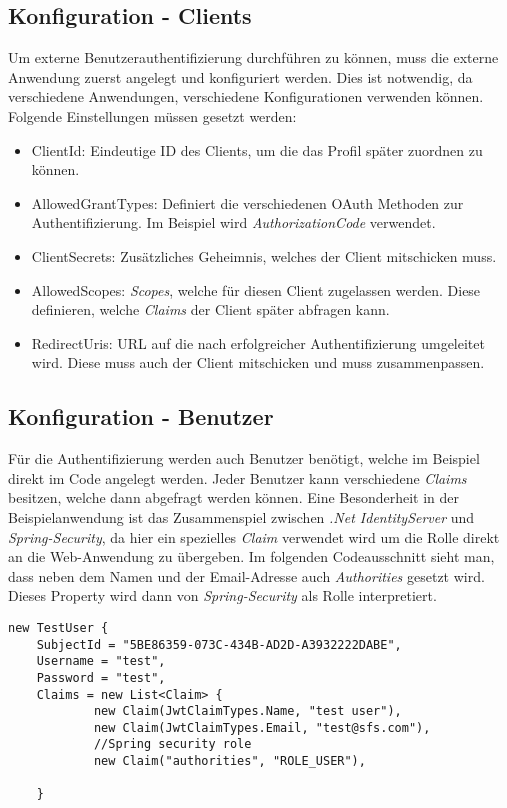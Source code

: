 \subsection*{Konfiguration - Clients}
Um externe Benutzerauthentifizierung durchführen zu können, muss die externe Anwendung zuerst angelegt und konfiguriert werden. Dies ist notwendig, da verschiedene Anwendungen, verschiedene Konfigurationen verwenden können. Folgende Einstellungen müssen gesetzt werden:
\begin{itemize}
\item ClientId: Eindeutige ID des Clients, um die das Profil später zuordnen zu können.
\item AllowedGrantTypes: Definiert die verschiedenen OAuth Methoden zur Authentifizierung. Im Beispiel wird \emph{AuthorizationCode} verwendet.
\item ClientSecrets: Zusätzliches Geheimnis, welches der Client mitschicken muss.
\item AllowedScopes: \emph{Scopes}, welche für diesen Client zugelassen werden. Diese definieren, welche \emph{Claims} der Client später abfragen kann.
\item RedirectUris: URL auf die nach erfolgreicher Authentifizierung umgeleitet wird. Diese muss auch der Client mitschicken und muss zusammenpassen.
\end{itemize}

\subsection*{Konfiguration - Benutzer}
Für die Authentifizierung werden auch Benutzer benötigt, welche im Beispiel direkt im Code angelegt werden. Jeder Benutzer kann verschiedene \emph{Claims} besitzen, welche dann abgefragt werden können. Eine Besonderheit in der Beispielanwendung ist das Zusammenspiel zwischen \emph{.Net IdentityServer} und \emph{Spring-Security}, da hier ein spezielles \emph{Claim} verwendet wird um die Rolle direkt an die Web-Anwendung zu übergeben. Im folgenden Codeausschnitt sieht man, dass neben dem Namen und der Email-Adresse auch \emph{Authorities} gesetzt wird. Dieses Property wird dann von \emph{Spring-Security} als Rolle interpretiert.

\begin{verbatim}
new TestUser {
	SubjectId = "5BE86359-073C-434B-AD2D-A3932222DABE",
	Username = "test",
	Password = "test",
	Claims = new List<Claim> {
			new Claim(JwtClaimTypes.Name, "test user"),
			new Claim(JwtClaimTypes.Email, "test@sfs.com"),
			//Spring security role
			new Claim("authorities", "ROLE_USER"),
			
	}
\end{verbatim}

